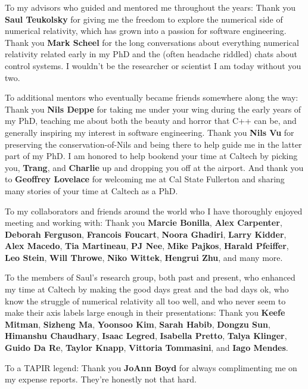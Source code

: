 \documentclass[11pt]{caltech_thesis}
\begin{document}
\begin{acknowledgements}
  To my advisors who guided and mentored me throughout the years: Thank you
  \textbf{Saul Teukolsky} for giving me the freedom to explore the numerical
  side of numerical relativity, which has grown into a passion for software
  engineering. Thank you \textbf{Mark Scheel} for the long conversations about
  everything numerical relativity related early in my PhD and the (often
  headache riddled) chats about control systems.  I wouldn't be the researcher
  or scientist I am today without you two.

  To additional mentors who eventually became friends somewhere along the way:
  Thank you \textbf{Nils Deppe} for taking me under your wing during the early
  years of my PhD, teaching me about both the beauty and horror that C++ can be,
  and generally inspiring my interest in software engineering. Thank you
  \textbf{Nils Vu} for preserving the conservation-of-Nils and being there to
  help guide me in the latter part of my PhD. I am honored to help bookend your
  time at Caltech by picking you, \textbf{Trang}, and \textbf{Charlie} up and
  dropping you off at the airport. And thank you to \textbf{Geoffrey Lovelace}
  for welcoming me at Cal State Fullerton and sharing many stories of your time
  at Caltech as a PhD.

  To my collaborators and friends around the world who I have thoroughly enjoyed
  meeting and working with: Thank you \textbf{Marcie Bonilla}, \textbf{Alex
  Carpenter}, \textbf{Deborah Ferguson}, \textbf{Francois Foucart},
  \textbf{Noora Ghadiri}, \textbf{Larry Kidder}, \textbf{Alex Macedo},
  \textbf{Tia Martineau}, \textbf{PJ Nee}, \textbf{Mike Pajkos}, \textbf{Harald
  Pfeiffer}, \textbf{Leo Stein}, \textbf{Will Throwe}, \textbf{Niko Wittek},
  \textbf{Hengrui Zhu}, and many more.

  To the members of Saul's research group, both past and present, who enhanced
  my time at Caltech by making the good days great and the bad days ok, who know
  the struggle of numerical relativity all too well, and who never seem to make
  their axis labels large enough in their presentations: Thank you \textbf{Keefe
  Mitman}, \textbf{Sizheng Ma}, \textbf{Yoonsoo Kim}, \textbf{Sarah Habib},
  \textbf{Dongzu Sun}, \textbf{Himanshu Chaudhary}, \textbf{Isaac Legred},
  \textbf{Isabella Pretto}, \textbf{Talya Klinger}, \textbf{Guido Da Re},
  \textbf{Taylor Knapp},  \textbf{Vittoria Tommasini}, and \textbf{Iago Mendes}.

  To a TAPIR legend: Thank you \textbf{JoAnn Boyd} for always complimenting me
  on my expense reports. They're honestly not that hard.


\end{acknowledgements}
\end{document}
